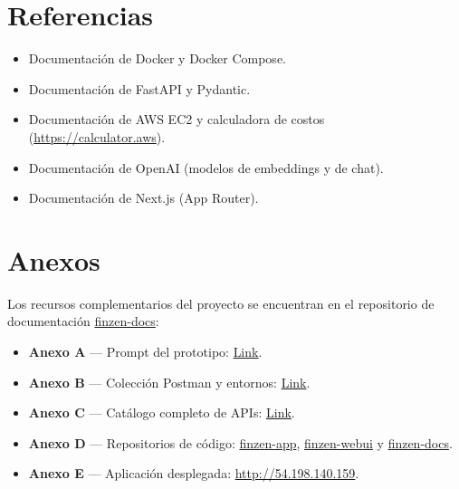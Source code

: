 \documentclass[12pt,letterpaper]{article}
\begin{document}
\section*{Referencias}
\begin{itemize}[leftmargin=1.2cm]
  \item Documentaci\'on de Docker y Docker Compose.
  \item Documentaci\'on de FastAPI y Pydantic.
  \item Documentaci\'on de AWS EC2 y calculadora de costos (\url{https://calculator.aws}).
  \item Documentaci\'on de OpenAI (modelos de embeddings y de chat).
  \item Documentaci\'on de Next.js (App Router).
\end{itemize}

\section*{Anexos}
Los recursos complementarios del proyecto se encuentran en el repositorio de
documentaci\'on \href{https://github.com/UTEC-AII/finzen-docs}{finzen-docs}:
\begin{itemize}[leftmargin=1.2cm]
  \item \textbf{Anexo A} --- Prompt del prototipo:
        \href{https://github.com/UTEC-AII/finzen-docs/blob/main/frontend-prompt/prompt.md}{Link}.
  \item \textbf{Anexo B} --- Colecci\'on Postman y entornos:
        \href{https://github.com/UTEC-AII/finzen-docs/tree/main/postman}{Link}.
  \item \textbf{Anexo C} --- Cat\'alogo completo de APIs:
        \href{https://github.com/UTEC-AII/finzen-docs/blob/main/CATALOGO_DE_APIS.md}{Link}.
  \item \textbf{Anexo D} --- Repositorios de c\'odigo:
        \href{https://github.com/UTEC-AII/finzen-app}{finzen-app},
        \href{https://github.com/UTEC-AII/finzen-webui}{finzen-webui} y
        \href{https://github.com/UTEC-AII/finzen-docs}{finzen-docs}.
  \item \textbf{Anexo E} --- Aplicaci\'on desplegada:
        \href{http://54.198.140.159}{http://54.198.140.159}.
\end{itemize}
\end{document}
